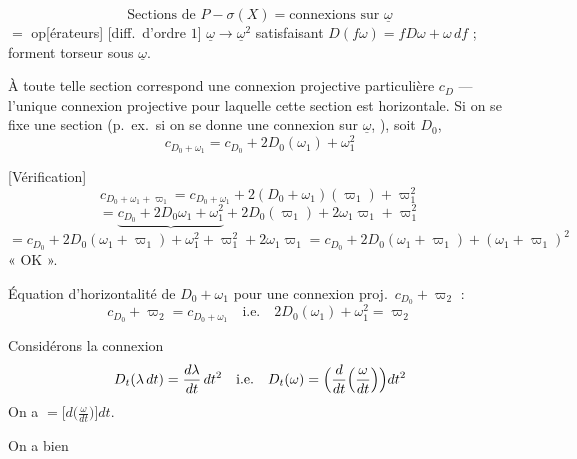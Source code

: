 \documentclass[11pt,a4paper]{article}
\begin{document}
\[
\text{Sections de }P-\sigma(X)=\text{connexions sur }\underline{\omega}
\]
$=$ op[érateurs] [diff.\ d'ordre $1$] $\underline{\omega}\to\underline{\omega}^2$ satisfaisant $D(f\omega)=fD\omega+\omega\,df$ ; forment torseur sous $\underline{\omega}$.

À toute telle section correspond une connexion projective particulière $c_D$ — l'unique connexion projective pour laquelle cette section est horizontale.  Si on se fixe une section (p.\ ex.\ si on se donne une connexion sur $\underline{\omega}$, \ill{} \ill{} \ill{}), soit $D_0$, \struck{\ill{}} 
\[
\boxed{c_{D_0+\omega_1}=c_{D_0}+2D_0(\omega_1)+\omega_1^2}
\]

[Vérification]
\[
c_{D_0+\omega_1+\varpi_1}=c_{D_0+\omega_1}+2(D_0+\omega_1)(\varpi_1)+\varpi_1^2
\]
\[
=\underbrace{c_{D_0}+2D_0\omega_1+\omega_1^2}+2D_0(\varpi_1)+2\omega_1\varpi_1+\varpi_1^2
\]
\[
=c_{D_0}+2D_0(\omega_1+\varpi_1)+\omega_1^2+\varpi_1^2+2\omega_1\varpi_1
=c_{D_0}+2D_0(\omega_1+\varpi_1)+(\omega_1+\varpi_1)^2
\]
« OK ».

Équation d'horizontalité de $D_0+\omega_1$ pour une connexion proj.\ $c_{D_0}+\varpi_2$ :
\[
c_{D_0}+\varpi_2=c_{D_0+\omega_1}\quad\text{i.e.}\quad
\boxed{2D_0(\omega_1)+\omega_1^2=\varpi_2}
\]

Considérons la connexion
\[
D_t(\lambda\,dt)=\frac{d\lambda}{dt}\,dt^2\quad\text{i.e.}\quad D_t(\omega)=\Bigl(\frac{d}{dt}\Bigl(\frac{\omega}{dt}\Bigr)\Bigr)dt^2
\]
On a  $=\bigl[d\bigl(\frac{\omega}{dt}\bigr)\bigr]dt$.

On a bien 
\end{document}

